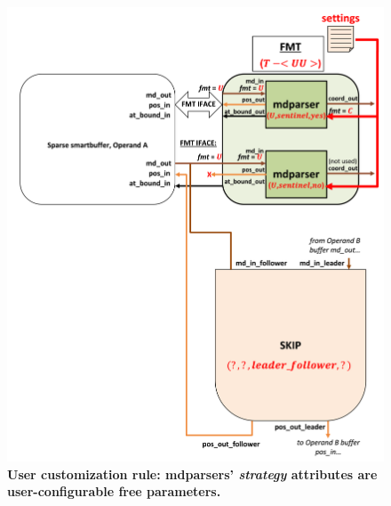 \begin{figure}[ht]
\includegraphics[width=\textwidth]{figures/safinference_build_06mdparserstratcust.png}
\caption{\textbf{User customization rule: mdparsers' \textit{strategy} attributes are user-configurable free parameters.  }}
\label{fig:safinference_build_06mdparserstratcust}
\centering
\end{figure}



